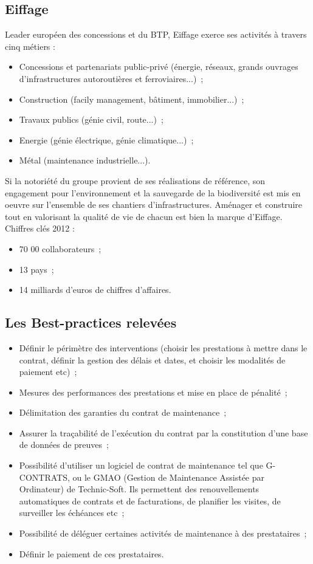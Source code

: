     \subsection{Eiffage}
    	Leader européen des concessions et du BTP, Eiffage exerce ses activités à travers cinq métiers :
    \begin{itemize}
    	\item Concessions et partenariats public-privé (énergie, réseaux, grands ouvrages d'infrastructures autoroutières et ferroviaires...)~;
    	\item Construction (facily management, bâtiment, immobilier...)~;
    	\item Travaux publics (génie civil, route...)~;
    	\item Energie (génie électrique, génie climatique...)~;
    	\item Métal (maintenance industrielle...).
    \end{itemize}
    \bigbreak
    	Si la notoriété du groupe provient de ses réalisations de référence, son engagement pour l'environnement et la sauvegarde de la biodiversité est mis en oeuvre sur l'ensemble de ses chantiers d'infrastructures. Aménager et construire tout en valorisant la qualité de vie de chacun est bien la marque d'Eiffage.
    \bigbreak
    Chiffres clés 2012 :
    \begin{itemize}
    	\item 70 00 collaborateurs~;
    	\item 13 pays~;
    	\item 14 milliards d'euros de chiffres d'affaires.
    \end{itemize}

    \subsection{Les Best-practices relevées}
    \begin{itemize}
    	\item Définir le périmètre des interventions (choisir les prestations à mettre dans le contrat, définir la gestion des délais et dates, et choisir les modalités de paiement etc)~;
    	\item Mesures des performances des prestations et mise en place de pénalité~;
    	\item Délimitation des garanties du contrat de maintenance~;
    	\item Assurer la traçabilité de l'exécution du contrat par la constitution d'une base de données de preuves~;
    	\item Possibilité d'utiliser un logiciel de contrat de maintenance tel que G-CONTRATS, ou le GMAO (Gestion de Maintenance Assistée par Ordinateur) de Technic-Soft. Ils permettent des renouvellements automatiques de contrats et de facturations, de planifier les visites, de surveiller les échéances etc~;
    	\item Possibilité de déléguer certaines activités de maintenance à des prestataires~;
    	\item Définir le paiement de ces prestataires.
    \end{itemize}



